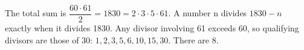 The total sum is $\dfrac{60\cdot61}{2}=1830=2\cdot3\cdot5\cdot61$. A number n divides $1830-n$ exactly when it divides 1830. Any divisor involving 61 exceeds 60, so qualifying divisors are those of 30: $1,2,3,5,6,10,15,30$. There are $\boxed8$.
